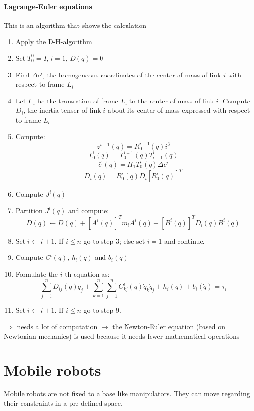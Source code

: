 \documentclass[12pt]{article}
\begin{document}
	\paragraph{Lagrange-Euler equations} This is an algorithm that shows the calculation
	\begin{enumerate}
		\item Apply the D-H-algorithm
		\item Set $T^0_0 = I$, $i = 1$, $D(q) = 0$
		\item Find $\Delta c^i$, the homogeneous coordinates of the center of mass of link $i$ with respect to frame $L_i$
		\item Let $L_c$ be the translation of frame $L_i$ to the center of mass of link $i$. Compute $\bar{D_i}$, the inertia tensor of link $i$ about its center of mass expressed with respect to frame $L_c$
		\item Compute: $$z^{i-1}(q) = R^{i-1}_0(q) i^3$$
		$$T^i_0(q) = T^{i-1}_0(q)T^i_{i-1}(q)$$
		$$\bar{c}^i(q) = H_1 T^i_0(q) \Delta c^i$$
		$$D_i(q) = R^i_0(q) \bar{D}_i [R^i_0(q)]^T$$
		\item Compute $J^i(q)$
		\item Partition $J^i(q)$ and compute: $$D(q) \leftarrow D(q) + [A^i(q)]^T m_i A^i(q) + [B^i(q)]^T D_i(q) B^i(q)$$
		\item Set $i \leftarrow i + 1$. If $i \leq n$ go to step 3; else set $i = 1$ and continue.
		\item Compute $C^i(q)$, $h_i(q)$ and $b_i(\dot{q})$
		\item Formulate the $i$-th equation as:
		$$ \sum_{j=1}^n D_{ij}(q) \ddot{q}_j + \sum_{k=1}^{n} \sum_{j=1}^{n} C^i_{kj}(q) \dot{q}_k \dot{q}_j + h_i(q) + b_i(\dot{q}) = \tau_i $$
		\item Set $i \leftarrow i + 1$. If $i \leq n$ go to step 9.
	\end{enumerate}
	$\Rightarrow$ needs a lot of computation $\rightarrow$ the Newton-Euler equation (based on Newtonian mechanics) is used because it needs fewer mathematical operations
	
	\section{Mobile robots}
	Mobile robots are not fixed to a base like manipulators. They can move regarding their constraints in a pre-defined space.
	
\end{document}
